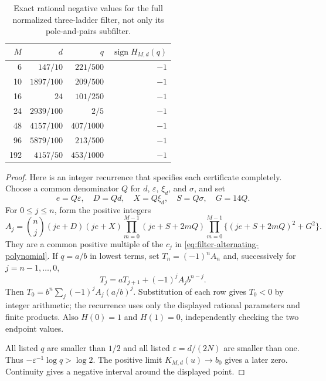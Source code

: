 \documentclass[11pt]{article}
\theoremstyle{definition}
\theoremstyle{remark}
\begin{document}
\begin{table}[htbp]
\centering
\begin{tabular}{rrrr}
\toprule
$M$ & $d$ & $q$ & $\operatorname{sign}H_{M,d}(q)$\\
\midrule
6   & $147/10$   & $221/500$ & $-1$\\
10  & $1897/100$ & $209/500$ & $-1$\\
16  & $24$       & $101/250$ & $-1$\\
24  & $2939/100$ & $2/5$     & $-1$\\
48  & $4157/100$ & $407/1000$ & $-1$\\
96  & $5879/100$ & $213/500$ & $-1$\\
192 & $4157/50$  & $453/1000$ & $-1$\\
\bottomrule
\end{tabular}
\caption{Exact rational negative values for the full normalized
three-ladder filter, not only its pole-and-pairs subfilter.}
\label{tab:filter-exact-signs}
\end{table}

\begin{proof}
Here is an integer recurrence that specifies each certificate completely.
Choose a common denominator $Q$ for $d$, $\varepsilon$, $\xi_d$, and
$\sigma$, and set
\[
 e=Q\varepsilon,\quad D=Qd,\quad X=Q\xi_d,\quad S=Q\sigma,
 \quad G=14Q.
\]
For $0\le j\le n$, form the positive integers
\begin{equation}
 A_j=\binom nj(je+D)(je+X)
 \prod_{m=0}^{M-1}(je+S+2mQ)
 \prod_{m=0}^{M-1}\{(je+S+2mQ)^2+G^2\}.
 \label{eq:filter-integer-coefficients}
\end{equation}
They are a common positive multiple of the $c_j$ in
\eqref{eq:filter-alternating-polynomial}.  If $q=a/b$ in lowest
terms, set $T_n=(-1)^nA_n$ and, successively for $j=n-1,\ldots,0$,
\begin{equation}
 T_j=aT_{j+1}+(-1)^jA_jb^{n-j}.
 \label{eq:filter-integer-horner}
\end{equation}
Then $T_0=b^n\sum_j(-1)^jA_j(a/b)^j$.  Substitution of each row
gives $T_0<0$ by integer arithmetic; the recurrence uses only the
displayed rational parameters and finite products.  Also $H(0)=1$
and $H(1)=0$, independently checking the two endpoint values.

All listed $q$ are smaller than $1/2$ and all listed
$\varepsilon=d/(2N)$ are smaller than one.  Thus
$-\varepsilon^{-1}\log q>\log2$.  The positive limit
$K_{M,d}(u)\to b_0$ gives a later zero.  Continuity gives a negative
interval around the displayed point.
\end{proof}
\end{document}
